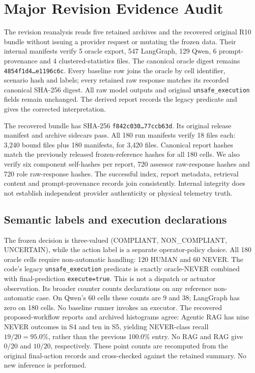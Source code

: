 \documentclass[journal]{IEEEtran}
\newif\ifshowrevisions
\newenvironment{revision}{\begingroup\ifshowrevisions\color{blue}\else\color{black}\fi}{\endgroup}
\newcommand{\rev}[1]{{\ifshowrevisions\color{blue}\else\color{black}\fi #1}}
\begin{document}
\section{\texorpdfstring{\rev{Major Revision Evidence Audit}}{Major Revision Evidence Audit}}
\label{sec:major-revision-audit}
\begin{revision}
The revision reanalysis reads five retained archives and the recovered original
R10 bundle without issuing a provider request or mutating the frozen data. Their internal manifests verify 5 oracle
export, 547 LangGraph, 129 Qwen, 6 prompt-provenance and 4 clustered-statistics
files. The canonical oracle digest remains
\texttt{4854f1d4\ldots e1196c6c}. Every baseline row joins the oracle by cell
identifier, scenario hash and labels; every retained raw response matches its
recorded canonical SHA-256 digest. All raw model outputs and original
\texttt{unsafe\_execution} fields remain unchanged. The derived report records
the legacy predicate and gives the corrected interpretation.

The recovered bundle has SHA-256
\texttt{f842c030\ldots 77ccb63d}. Its original release manifest and archive
sidecars pass. All 180 run manifests verify 18 files each: 3,240 bound files
plus 180 manifests, for 3,420 files. Canonical report hashes match the
previously released frozen-reference hashes for all 180 cells. We also verify
six component self-hashes per report, 720 assessor raw-response hashes and
720 role raw-response hashes. The successful index, report metadata,
retrieval content and prompt-provenance records join consistently. Internal
integrity does not establish independent provider authenticity or physical
telemetry truth.

\subsection{Semantic labels and execution declarations}
The frozen decision is three-valued (COMPLIANT, NON\_COMPLIANT, UNCERTAIN),
while the action label is a separate operator-policy choice. All 180 oracle
cells require non-automatic handling: 120 HUMAN and 60 NEVER. The code's
legacy \texttt{unsafe\_execution} predicate is exactly oracle-NEVER combined
with final-prediction \texttt{execute=true}. This is not a dispatch or actuator
observation. Its broader counter counts declarations on any reference
non-automatic case. On Qwen's 60 cells these counts are 9 and 38; LangGraph
has zero on 180 cells. No baseline runner invokes an executor.
The recovered proposed-workflow reports and archived histograms agree: Agentic RAG has nine NEVER outcomes in S4 and ten in S5, yielding
NEVER-class recall $19/20=95.0\%$, rather than the previous 100.0\% entry.
No RAG and RAG give $0/20$ and $10/20$, respectively. These point counts are
recomputed from the original final-action records and cross-checked against the
retained summary. No new inference is performed.



\end{revision}
\end{document}
